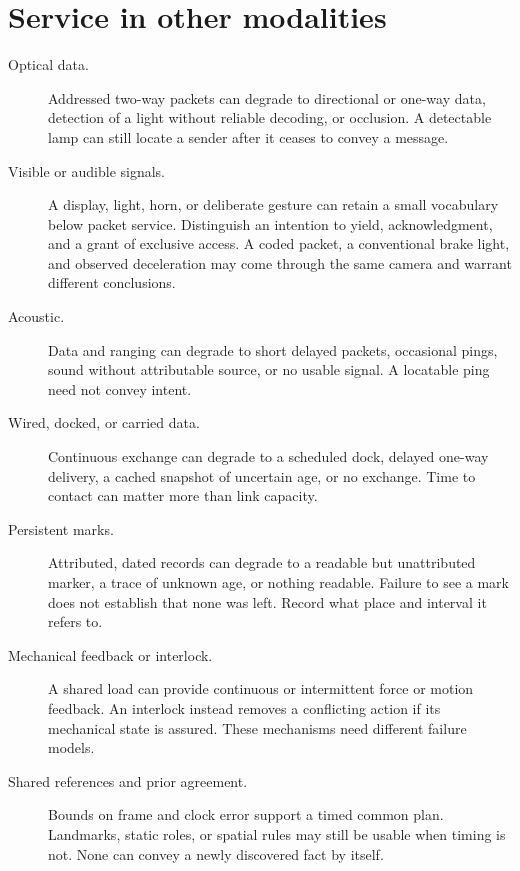 \documentclass[11pt]{article}
\begin{document}
\section{Service in other modalities}
\begin{description}
\item[Optical data.] Addressed two-way packets can degrade to directional or one-way data, detection of a light without reliable decoding, or occlusion. A detectable lamp can still locate a sender after it ceases to convey a message.
\item[Visible or audible signals.] A display, light, horn, or deliberate gesture can retain a small vocabulary below packet service. Distinguish an intention to yield, acknowledgment, and a grant of exclusive access. A coded packet, a conventional brake light, and observed deceleration may come through the same camera and warrant different conclusions.
\item[Acoustic.] Data and ranging can degrade to short delayed packets, occasional pings, sound without attributable source, or no usable signal. A locatable ping need not convey intent.
\item[Wired, docked, or carried data.] Continuous exchange can degrade to a scheduled dock, delayed one-way delivery, a cached snapshot of uncertain age, or no exchange. Time to contact can matter more than link capacity.
\item[Persistent marks.] Attributed, dated records can degrade to a readable but unattributed marker, a trace of unknown age, or nothing readable. Failure to see a mark does not establish that none was left. Record what place and interval it refers to.
\item[Mechanical feedback or interlock.] A shared load can provide continuous or intermittent force or motion feedback. An interlock instead removes a conflicting action if its mechanical state is assured. These mechanisms need different failure models.
\item[Shared references and prior agreement.] Bounds on frame and clock error support a timed common plan. Landmarks, static roles, or spatial rules may still be usable when timing is not. None can convey a newly discovered fact by itself.
\end{description}
\end{document}
